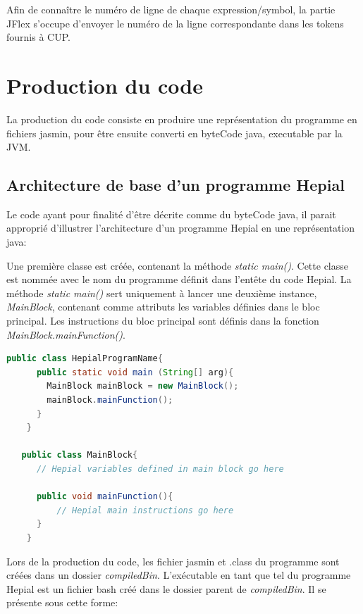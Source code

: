 \documentclass[11pt,a4paper]{article}
\begin{document}
  \par Afin de connaître le numéro de ligne de chaque expression/symbol, la partie JFlex s'occupe d'envoyer le numéro de la ligne correspondante dans les tokens fournis à CUP.
  
  \section{Production du code}
  
  \par La production du code consiste en produire une représentation du programme en fichiers jasmin, pour être ensuite converti en byteCode java, executable par la JVM. 
  
  \subsection{Architecture de base d'un programme Hepial}
  
  \par Le code ayant pour finalité d'être décrite comme du byteCode java, il parait approprié d'illustrer l'architecture d'un programme Hepial en une représentation java: 
  
  \par Une première classe est créée, contenant la méthode \textit{static main()}. Cette classe est nommée avec le nom du programme définit dans l'entête du code Hepial. La méthode \textit{static main()} sert uniquement à lancer une deuxième instance, \textit{MainBlock}, contenant comme attributs les variables définies dans le bloc principal. Les instructions du bloc principal sont définis dans la fonction \textit{MainBlock.mainFunction()}.
  
    \begin{lstlisting}[language=java,caption={Architecture de base d'un programme Hepial}]
    public class HepialProgramName{
      public static void main (String[] arg){
        MainBlock mainBlock = new MainBlock();
        mainBlock.mainFunction();
      }
    }
    
   public class MainBlock{
      // Hepial variables defined in main block go here
   
      public void mainFunction(){
          // Hepial main instructions go here
      }
    }
   \end{lstlisting}  
   
  \par Lors de la production du code, les fichier jasmin et .class du programme sont créées dans un dossier \textit{compiledBin}. L'exécutable en tant que tel du programme Hepial est un fichier bash créé dans le dossier parent de \textit{compiledBin}. Il se présente sous cette forme: 
  
\end{document}
